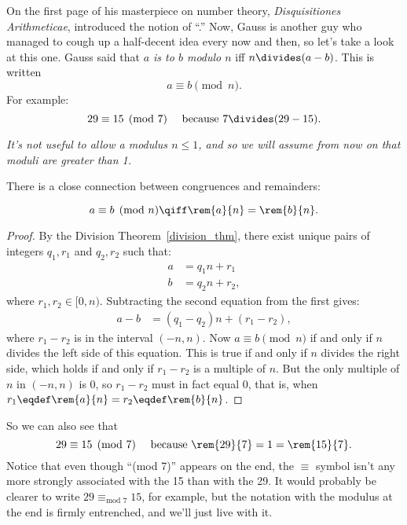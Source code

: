 On the first page of his masterpiece on number theory,
\emph{Disquisitiones Arithmeticae},  introduced the notion
of ``.''  Now, Gauss is another guy who managed to
cough up a half-decent idea every now and then, so let's take a look
at this one.  Gauss said that \emph{$a$ is  to $b$
  modulo $n$}  iff $n \divides (a - b)$.
This is written 
\[
a \equiv b \pmod{n}.
\]
For example:
\[
29 \equiv 15 \pmod{7} \quad\text{ because } 7 \divides (29 - 15).
\]

\emph{It's not useful to allow a modulus $n \leq 1$, and so we will
  assume from now on that moduli are greater than 1.}

There is a close connection between congruences and remainders:
\begin{lemma}[Remainder]\label{lem:conrem}
\[
a \equiv b \pmod{n} \qiff \rem{a}{n} = \rem{b}{n}.
\]
\end{lemma}

\begin{proof}
By the Division Theorem~\ref{division_thm}, there exist unique pairs
of integers $q_1, r_1$ and $q_2, r_2$ such that:
\begin{align*}
a & = q_1 n + r_1\\
b & = q_2 n + r_2,
\end{align*}
where $r_1,r_2 \in [0,n)$.  Subtracting the second equation from the
  first gives:
\begin{align*}
a - b & = (q_1 - q_2) n + (r_1 - r_2),
\end{align*}
where $r_1 - r_2$ is in the interval $(-n,n)$.  Now $a \equiv b
\pmod{n}$ if and only if $n$ divides the left side of this equation.
This is true if and only if $n$ divides the right side, which holds if
and only if $r_1 - r_2$ is a multiple of $n$.  But the only multiple
of $n$ in $(-n,n)$ is 0, so $r_1 - r_2$ must in fact equal 0, that is,
when $r_1 \eqdef \rem{a}{n} = r_2 \eqdef \rem{b}{n}$.
\end{proof}

So we can also see that
\[
29 \equiv 15 \pmod{7} \quad\text{ because } \rem{29}{7} = 1 =
\rem{15}{7}.
\]
Notice that even though ``(mod 7)'' appears on the end, the $\equiv$
symbol isn't any more strongly associated with the 15 than with the
29.  It would probably be clearer to write $29 \equiv_{\text{mod } 7}
15$, for example, but the notation with the modulus at the end is
firmly entrenched, and we'll just live with it.


